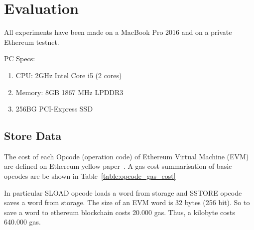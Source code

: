 \chapter{Evaluation}
\label{evaluation}

All experiments have been made on a MacBook Pro 2016 and on a private Ethereum testnet.

PC Specs:

\begin{enumerate}
  \item CPU: 2GHz Intel Core i5 (2 cores)
  \item Memory: 8GB 1867 MHz LPDDR3
  \item 256BG PCI-Express SSD
\end{enumerate}

\section{Store Data}
\label{evaluation:store_data}

The cost of each Opcode (operation code) of Ethereum Virtual Machine (EVM) are defined on Ethereum yellow paper~\cite{ethereum_yellowpaper}. A gas cost summarisation of basic opcodes are be shown in Table~\ref{table:opcode_gas_cost}

In particular SLOAD opcode loads a word from storage and SSTORE opcode saves a word from storage. The size of an EVM word is 32 bytes (256 bit). So to save a word to ethereum blockchain costs 20.000 gas. Thus, a kilobyte costs 640.000 gas.

